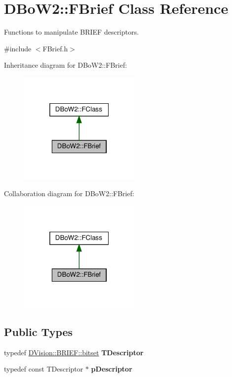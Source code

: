 \hypertarget{classDBoW2_1_1FBrief}{}\section{D\+Bo\+W2\+:\+:F\+Brief Class Reference}
\label{classDBoW2_1_1FBrief}


Functions to manipulate B\+R\+I\+EF descriptors.  




{\ttfamily \#include $<$F\+Brief.\+h$>$}



Inheritance diagram for D\+Bo\+W2\+:\+:F\+Brief\+:\nopagebreak
\begin{figure}[H]
\begin{center}
\leavevmode
\includegraphics[width=169pt]{classDBoW2_1_1FBrief__inherit__graph}
\end{center}
\end{figure}


Collaboration diagram for D\+Bo\+W2\+:\+:F\+Brief\+:\nopagebreak
\begin{figure}[H]
\begin{center}
\leavevmode
\includegraphics[width=169pt]{classDBoW2_1_1FBrief__coll__graph}
\end{center}
\end{figure}
\subsection*{Public Types}
\begin{DoxyCompactItemize}
\item 
\mbox{\label{classDBoW2_1_1FBrief_acd27683ebe8fa8f482bf49f006930981}} 
typedef \hyperlink{classDVision_1_1BRIEF_abc56a095174a93b0741099f35230b7c5}{D\+Vision\+::\+B\+R\+I\+E\+F\+::bitset} {\bfseries T\+Descriptor}
\item 
\mbox{\label{classDBoW2_1_1FBrief_af7752017bb05cdac90a31491d701bb43}} 
typedef const T\+Descriptor $\ast$ {\bfseries p\+Descriptor}
\end{DoxyCompactItemize}
